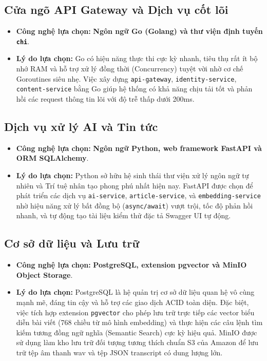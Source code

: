 \documentclass[12pt,a4paper]{report}
\begin{document}
\subsection{Cửa ngõ API Gateway và Dịch vụ cốt lõi}
\begin{itemize}
    \item \textbf{Công nghệ lựa chọn:} \textbf{Ngôn ngữ Go (Golang) và thư viện định tuyến \texttt{chi}}.
    \item \textbf{Lý do lựa chọn:} Go có hiệu năng thực thi cực kỳ nhanh, tiêu thụ rất ít bộ nhớ RAM và hỗ trợ xử lý đồng thời (Concurrency) tuyệt vời nhờ cơ chế Goroutines siêu nhẹ. Việc xây dựng \texttt{api-gateway}, \texttt{identity-service}, \texttt{content-service} bằng Go giúp hệ thống có khả năng chịu tải tốt và phản hồi các request thông tin lõi với độ trễ thấp dưới 200ms.
\end{itemize}

\subsection{Dịch vụ xử lý AI và Tin tức}
\begin{itemize}
    \item \textbf{Công nghệ lựa chọn:} \textbf{Ngôn ngữ Python, web framework FastAPI và ORM SQLAlchemy}.
    \item \textbf{Lý do lựa chọn:} Python sở hữu hệ sinh thái thư viện xử lý ngôn ngữ tự nhiên và Trí tuệ nhân tạo phong phú nhất hiện nay. FastAPI được chọn để phát triển các dịch vụ \texttt{ai-service}, \texttt{article-service}, và \texttt{embedding-service} nhờ hiệu năng xử lý bất đồng bộ (\texttt{async/await}) vượt trội, tốc độ phản hồi nhanh, và tự động tạo tài liệu kiểm thử đặc tả Swagger UI tự động.
\end{itemize}

\subsection{Cơ sở dữ liệu và Lưu trữ}
\begin{itemize}
    \item \textbf{Công nghệ lựa chọn:} \textbf{PostgreSQL, extension pgvector và MinIO Object Storage}.
    \item \textbf{Lý do lựa chọn:} PostgreSQL là hệ quản trị cơ sở dữ liệu quan hệ vô cùng mạnh mẽ, đáng tin cậy và hỗ trợ các giao dịch ACID toàn diện. Đặc biệt, việc tích hợp extension \texttt{pgvector} cho phép lưu trữ trực tiếp các vector biểu diễn bài viết (768 chiều từ mô hình embedding) và thực hiện các câu lệnh tìm kiếm tương đồng ngữ nghĩa (Semantic Search) cực kỳ hiệu quả. MinIO được sử dụng làm kho lưu trữ đối tượng tương thích chuẩn S3 của Amazon để lưu trữ tệp âm thanh wav và tệp JSON transcript có dung lượng lớn.
\end{itemize}
\end{document}

